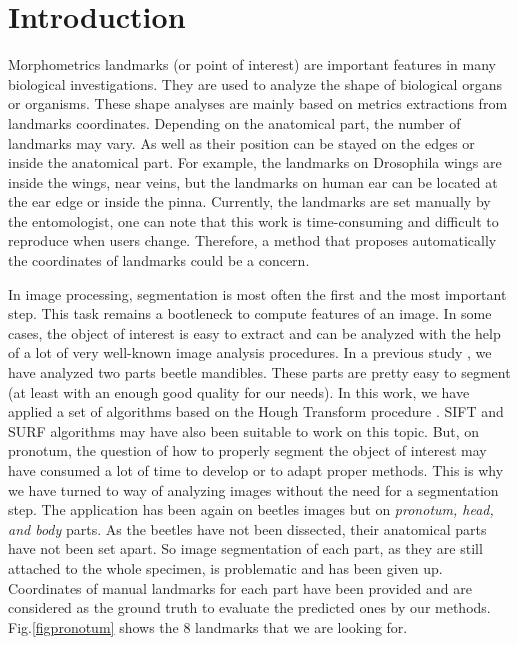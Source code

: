 \documentclass[10pt]{article}
\begin{document}
\section{Introduction}
Morphometrics landmarks (or point of interest) are important features
in many biological investigations. They are used to analyze
the shape of biological organs or organisms. These shape analyses are mainly
based on metrics extractions from landmarks coordinates. Depending on the anatomical part, the number of landmarks may vary. As well as their position can be stayed on the edges or inside the anatomical part. For example, the landmarks on Drosophila wings \cite{drosophilaWings} are inside the wings, near veins, but the landmarks on human ear \cite{cintas2016automatic} can be located at
the ear edge or inside the pinna. Currently, the landmarks are set manually by
the entomologist, one can note that this work is time-consuming and difficult to
reproduce when users change. Therefore, a method that proposes automatically the
coordinates of landmarks could be a concern.

In image processing, segmentation is most often the first and the most
important step. This task remains a bootleneck to compute features of
an image. In some cases, the object of interest is easy to extract and
can be analyzed with the help of a lot of very well-known image
analysis procedures. In a previous study \cite{le2017maelab}, we have analyzed two parts beetle mandibles. These parts are pretty easy to segment (at least with an enough good quality for our needs). In this work, we have applied a set of algorithms based on the Hough Transform procedure \cite{palaniswamy2010automatic}. SIFT
\cite{lowe2004distinctive} and SURF \cite{bay2006surf} algorithms may have also been suitable to work on this topic. But, on pronotum, the question of how to properly segment the object of interest  may have consumed a lot of time to develop or to adapt proper methods. This is why we have turned to way of analyzing images without the need for a segmentation step. The application has been again on beetles images
but on \textit{pronotum, head, and body} parts. As the beetles have not been dissected, their anatomical parts have not been set apart. So image segmentation of each part, as they are still attached to the whole specimen, is problematic and has been given up. Coordinates of manual landmarks for each part
have been provided and are considered as the ground
truth to evaluate the predicted ones by our methods. Fig.\ref{figpronotum} shows
the $8$ landmarks that we are looking for.
\end{document}
